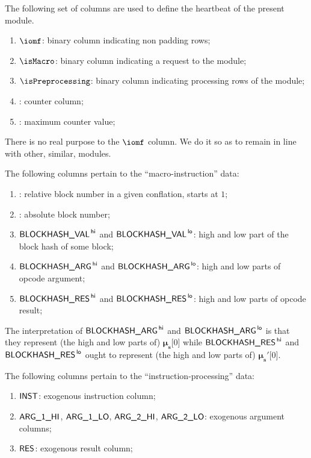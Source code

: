 The following set of columns are used to define the heartbeat of the present module.
\begin{enumerate}
	\item $\iomf$:
		binary column indicating non padding rows;
	\item $\isMacro$:
		binary column indicating a request to the \blockHashMod{} module;
	\item $\isPreprocessing$:
		binary column indicating processing rows of the \blockHashMod{} module;
	\item \ct:
		counter column;
	\item \ctMax:
		maximum counter value;
\end{enumerate}
\saNote{}
There is no real purpose to the $\iomf$ column.
We do it so as to remain in line with other, similar, modules.

\noindent The following columns pertain to the ``macro-instruction'' data:
\begin{enumerate}[resume]
	\item \relBlock{}: 
		relative block number in a given conflation, starts at $1$;
	\item \absBlock{}:
		absolute block number;
	\item $\textsf{BLOCKHASH\_VAL}^{\mathsf{\,hi}}$ and $\textsf{BLOCKHASH\_VAL}^{\mathsf{\,lo}}$: 
		high and low part of the block hash of some block;
	\item $\textsf{BLOCKHASH\_ARG}^{\mathsf{\,hi}}$ and $\textsf{BLOCKHASH\_ARG}^{\mathsf{\,lo}}$: 
		high and low parts of  opcode argument;
	\item $\textsf{BLOCKHASH\_RES}^{\mathsf{\,hi}}$ and $\textsf{BLOCKHASH\_RES}^{\mathsf{\,lo}}$:
		high and low parts of  opcode result;
\end{enumerate}
\saNote{}
The interpretation of $\textsf{BLOCKHASH\_ARG}^{\mathsf{\,hi}}$ and $\textsf{BLOCKHASH\_ARG}^{\mathsf{\,lo}}$ is that they represent
(the high and low parts of) $\bm{\mu}_\textbf{s}\big[0\big]$
while $\textsf{BLOCKHASH\_RES}^{\mathsf{\,hi}}$ and $\textsf{BLOCKHASH\_RES}^{\mathsf{\,lo}}$ ought to represent
(the high and low parts of) $\bm{\mu}_\textbf{s}'\big[0\big]$.

\noindent The following columns pertain to the ``instruction-processing'' data:
\begin{enumerate}[resume]
	\item $\textsf{INST}$:
		exogenous instruction column;
	\item $\textsf{ARG}\textsf{\_1}\textsf{\_HI}$, $\textsf{ARG}\textsf{\_1}\textsf{\_LO}$, $\textsf{ARG}\textsf{\_2}\textsf{\_HI}$, $\textsf{ARG}\textsf{\_2}\textsf{\_LO}$:
		exogenous argument columns;
	\item $\textsf{RES}$:
		exogenous result column;
\end{enumerate}
